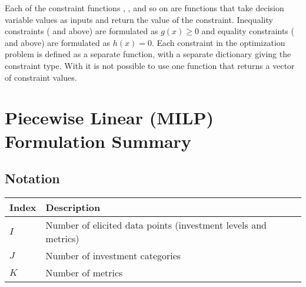 \documentclass[letterpaper,10pt,english]{sphinxmanual}
\begin{document}
Each of the constraint functions , , and so on are
functions that take decision variable values as inputs and return the
value of the constraint. Inequality constraints ( and 
above) are formulated as \(g(x) \geq 0\) and equality constraints
( and  above) are formulated as \(h(x) = 0\). Each
constraint in the optimization problem is defined as a separate
function, with a separate dictionary giving the constraint type. With
 it is not possible to use one function that returns a vector of
constraint values.


\section{Piecewise Linear (MILP) Formulation Summary}
\label{\detokenize{doc-src/optimizers:piecewise-linear-milp-formulation-summary}}

\subsection{Notation}
\label{\detokenize{doc-src/optimizers:notation}}

\begin{savenotes}\sphinxattablestart
\centering
{}
\sphinxthecaptionisattop
{}\label{\detokenize{doc-src/optimizers:table-1}}\label{\detokenize{doc-src/optimizers:tbl-milpindex}}
\sphinxaftertopcaption
\begin{tabulary}{\linewidth}[t]{|T|T|}
\hline
\sphinxstyletheadfamily 
Index
&\sphinxstyletheadfamily 
Description
\\
\hline
\(I\)
&
Number of elicited data points (investment levels and metrics)
\\
\hline
\(J\)
&
Number of investment categories
\\
\hline
\(K\)
&
Number of metrics
\\
\hline
\end{tabulary}
\par
\sphinxattableend\end{savenotes}
\end{document}
